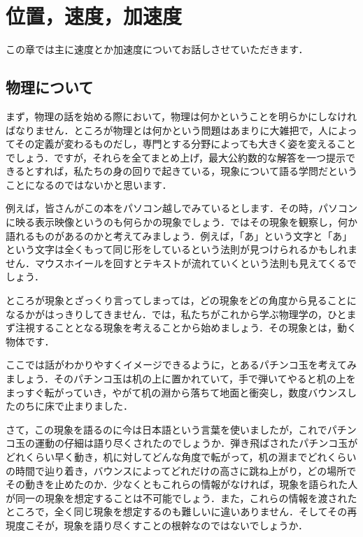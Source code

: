 \documentclass[
  b4paperpaper,
  xelatex,ja=standard]{bxjsbook}
\begin{document}


\hypertarget{ux4f4dux7f6eux901fux5ea6ux52a0ux901fux5ea6}{%
\chapter{位置，速度，加速度}\label{ux4f4dux7f6eux901fux5ea6ux52a0ux901fux5ea6}}

この章では主に速度とか加速度についてお話しさせていただきます．

\hypertarget{ux7269ux7406ux306bux3064ux3044ux3066}{%
\section{物理について}\label{ux7269ux7406ux306bux3064ux3044ux3066}}

まず，物理の話を始める際において，物理は何かということを明らかにしなければなりません．ところが物理とは何かという問題はあまりに大雑把で，人によってその定義が変わるものだし，専門とする分野によっても大きく姿を変えることでしょう．ですが，それらを全てまとめ上げ，最大公約数的な解答を一つ提示できるとすれば，私たちの身の回りで起きている，現象について語る学問だということになるのではないかと思います．

例えば，皆さんがこの本をパソコン越しでみているとします．その時，パソコンに映る表示映像というのも何らかの現象でしょう．ではその現象を観察し，何か語れるものがあるのかと考えてみましょう．例えば，「あ」という文字と「あ」という文字は全くもって同じ形をしているという法則が見つけられるかもしれません．マウスホイールを回すとテキストが流れていくという法則も見えてくるでしょう．

ところが現象とざっくり言ってしまっては，どの現象をどの角度から見ることになるかがはっきりしてきません．では，私たちがこれから学ぶ物理学の，ひとまず注視することとなる現象を考えることから始めましょう．その現象とは，動く物体です．

ここでは話がわかりやすくイメージできるように，とあるパチンコ玉を考えてみましょう．そのパチンコ玉は机の上に置かれていて，手で弾いてやると机の上をまっすぐ転がっていき，やがて机の淵から落ちて地面と衝突し，数度バウンスしたのちに床で止まりました．

さて，この現象を語るのに今は日本語という言葉を使いましたが，これでパチンコ玉の運動の仔細は語り尽くされたのでしょうか．弾き飛ばされたパチンコ玉がどれくらい早く動き，机に対してどんな角度で転がって，机の淵までどれくらいの時間で辿り着き，バウンスによってどれだけの高さに跳ね上がり，どの場所でその動きを止めたのか．少なくともこれらの情報がなければ，現象を語られた人が同一の現象を想定することは不可能でしょう．また，これらの情報を渡されたところで，全く同じ現象を想定するのも難しいに違いありません．そしてその再現度こそが，現象を語り尽くすことの根幹なのではないでしょうか．
\end{document}
